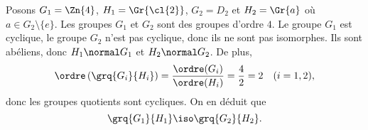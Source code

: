 Posons $G_1 = \Zn{4}$, $H_1 = \Gr{\cl{2}}$, $G_2 = D_2$ et $H_2 = \Gr{a}$ où
$a\in G_2\setminus\{e\}$. Les groupes $G_1$ et $G_2$ sont des groupes d'ordre
$4$. Le groupe $G_1$ est cyclique, le groupe $G_2$ n'est pas cyclique, donc ils
ne sont pas isomorphes. Ils sont abéliens, donc $H_1 \normal G_1$ et $H_2
\normal G_2$. De plus, 
\[
  \ordre\left(\grq{G_i}{H_i}\right) 
  = \frac{\ordre(G_i)}{\ordre(H_i)} 
  = \frac{4}{2} 
  = 2\quad (i=1,2),
\]
donc les groupes quotients sont cycliques. On en déduit que
\[
  \grq{G_1}{H_1} \iso \grq{G_2}{H_2}.
\]
